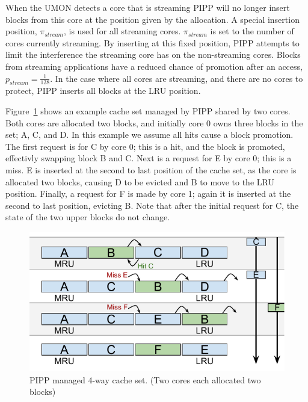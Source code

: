 When the UMON detects a core that is streaming PIPP will no longer insert blocks from this core at the position given by the allocation.
A special insertion position, $\pi_{stream}$, is used for all streaming cores.
$\pi_{stream}$ is set to the number of cores currently streaming. 
By inserting at this fixed position, PIPP attempts to limit the interference the streaming core has on the non-streaming cores.
Blocks from streaming applications have a reduced chance of promotion after an access, $p_{stream} = \frac{1}{128}$.
In the case where all cores are streaming, and there are no cores to protect, PIPP inserts all blocks at the LRU position.

Figure~\ref{fig:algorithms:pipp_example} shows an example cache set managed by PIPP shared by two cores.
Both cores are allocated two blocks, and initially core 0 owns three blocks in the set; A, C, and D.
In this example we assume all hits cause a block promotion.
The first request is for C by core 0; this is a hit, and the block is promoted, effectivly swapping block B and C.
Next is a request for E by core 0; this is a miss.
E is inserted at the second to last position of the cache set, as the core is allocated two blocks, causing D to be evicted and B to move to the LRU position.
Finally, a request for F is made by core 1; again it is inserted at the second to last position, evicting B.
Note that after the initial request for C, the state of the two upper blocks do not change.

\begin{figure}[ht]
    \centering
    \includegraphics[width=.65\textwidth]{figures/algorithms/PIPP}
    \caption[PIPP managed 4-way cache set.]{PIPP managed 4-way cache set. (Two cores each allocated two blocks)}
    \label{fig:algorithms:pipp_example}
\end{figure}